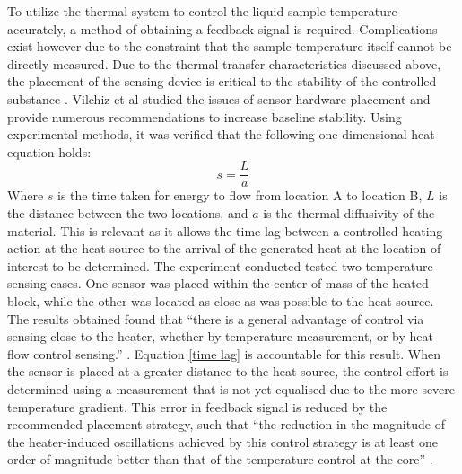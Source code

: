To utilize the thermal system to control the liquid sample temperature accurately, a method of obtaining a feedback signal is required. Complications exist however due to the constraint that the sample temperature itself cannot be directly measured. Due to the thermal transfer characteristics discussed above, the placement of the sensing device is critical to the stability of the controlled substance \cite{20130415930883}. Vilchiz et al studied the issues of sensor hardware placement and provide numerous recommendations to increase baseline stability. Using experimental methods, it was verified that the following one-dimensional heat equation holds:
\begin{equation}\label{time lag}
s=\frac{L}{a}
\end{equation}
Where $s$ is the time taken for energy to flow from location A to location B, $L$ is the distance between the two locations, and $a$ is the thermal diffusivity of the material. This is relevant as it allows the time lag between a controlled heating action at the heat source to the arrival of the generated heat at the location of interest to be determined. The experiment conducted tested two temperature sensing cases. One sensor was placed within the center of mass of the heated block, while the other was located as close as was possible to the heat source. The results obtained found that ``there is a general advantage of control via sensing close to the heater, whether by temperature measurement, or by heat-flow control sensing.'' \cite{20130415930883}. Equation \ref{time lag} is accountable for this result. When the sensor is placed at a greater distance to the heat source, the control effort is determined using a measurement that is not yet equalised due to the more severe temperature gradient. This error in feedback signal is reduced by the recommended placement strategy, such that ``the reduction in the magnitude of the heater-induced oscillations achieved by this control strategy is at least one order of magnitude better than that of the temperature control at the core'' \cite{20130415930883}.\\

